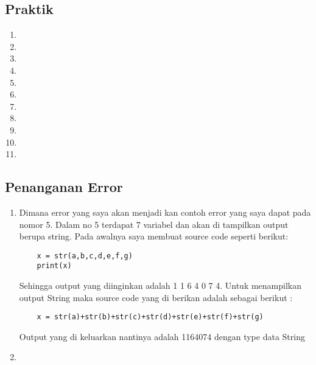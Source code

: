\subsection{Praktik}
	\begin{enumerate}
	\item 
	
	\item
	
	\item
	
	\item
	
	\item
	
	\item
	
	\item
	
	\item
	
	\item
	
	\item
	
	\item
	
	\end{enumerate}

\subsection{Penanganan Error}
	\begin{enumerate}
	\item
	\subitem
	Dimana error yang saya akan menjadi kan contoh error yang saya dapat pada nomor 5. Dalam no 5 terdapat 7 variabel dan akan di tampilkan output berupa string. Pada awalnya saya membuat source code seperti berikut:
	\begin{verbatim}
	x = str(a,b,c,d,e,f,g)
	print(x)
	\end{verbatim}
	Sehingga output yang diinginkan adalah 1 1 6 4 0 7 4. Untuk menampilkan output String maka source code yang di berikan adalah sebagai berikut :
	\begin{verbatim}
	x = str(a)+str(b)+str(c)+str(d)+str(e)+str(f)+str(g)
	\end{verbatim}
	Output yang di keluarkan nantinya adalah 1164074 dengan type data String

	\item
	
	\end{enumerate}

